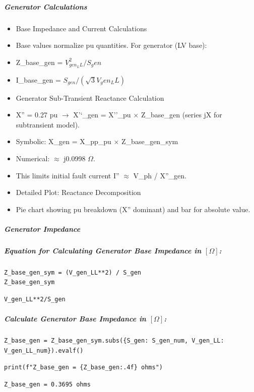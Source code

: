 \subparagraph{Generator Calculations}

\begin{itemize}
\item Base Impedance and Current Calculations
\item Base values normalize pu quantities. For generator (LV base):
\item Z\_base\_gen = $V_{gen_LL}^2 / S_gen$
\item I\_base\_gen = $S_{gen} / (\sqrt{3} V_gen_LL)$
\item Generator Sub-Transient Reactance Calculation
\item X'' = 0.27 pu $\to$ X'`\_gen = X''\_pu $\times$ Z\_base\_gen (series jX for subtransient model).
\item Symbolic: X\_gen = X\_pp\_pu $\times$ Z\_base\_gen\_sym
\item Numerical: $\approx$ j0.0998 $\Omega$.
\item This limits initial fault current I'' $\approx$ V\_ph / X''\_gen.
\item Detailed Plot: Reactance Decomposition
\item Pie chart showing pu breakdown (X'' dominant) and bar for absolute value.
\end{itemize}

\subparagraph{Generator Impedance}

\subparagraph{Equation for Calculating Generator Base Impedance in $\left[\Omega\right]$:}

\begin{verbatim}
Z_base_gen_sym = (V_gen_LL**2) / S_gen
Z_base_gen_sym
\end{verbatim}

\begin{verbatim}
V_gen_LL**2/S_gen
\end{verbatim}

\subparagraph{Calculate Generator Base Impedance in $\left[\Omega\right]$:}

\begin{verbatim}
Z_base_gen = Z_base_gen_sym.subs({S_gen: S_gen_num, V_gen_LL: V_gen_LL_num}).evalf()
\end{verbatim}

\begin{verbatim}
print(f"Z_base_gen = {Z_base_gen:.4f} ohms")
\end{verbatim}

\begin{verbatim}
Z_base_gen = 0.3695 ohms
\end{verbatim}

